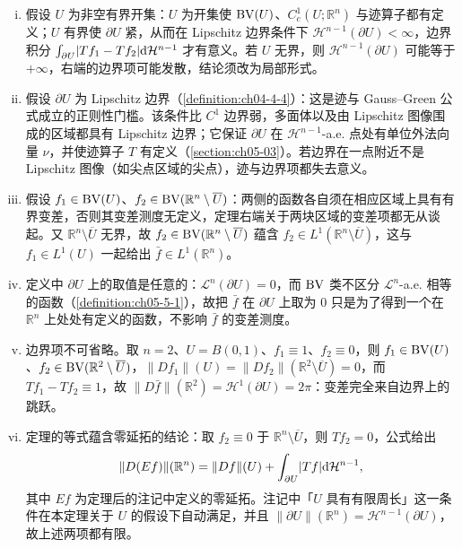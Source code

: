 \documentclass[../../main.tex]{subfiles}%
\begin{document}
\begin{remark}\label{remark:ch05-thm-5-8-条件}
\begin{enumerate}[(i)]
\item 假设 $U$ 为非空有界开集：$U$ 为开集使 $\mathrm{BV}(U)$、$C_c^1(U;\mathbb{R}^n)$ 与迹算子都有定义；$U$ 有界使 $\partial U$ 紧，从而在 Lipschitz 边界条件下 $\mathcal{H}^{n-1}(\partial U)<\infty$，边界积分 $\int_{\partial U}\lvert Tf_1-Tf_2\rvert\mathrm{d}\mathcal{H}^{n-1}$ 才有意义。若 $U$ 无界，则 $\mathcal{H}^{n-1}(\partial U)$ 可能等于 $+\infty$，右端的边界项可能发散，结论须改为局部形式。
\item 假设 $\partial U$ 为 Lipschitz 边界（\cref{definition:ch04-4-4}）：这是迹与 Gauss--Green 公式成立的正则性门槛。该条件比 $C^1$ 边界弱，多面体以及由 Lipschitz 图像围成的区域都具有 Lipschitz 边界；它保证 $\partial U$ 在 $\mathcal{H}^{n-1}$-a.e. 点处有单位外法向量 $\nu$，并使迹算子 $T$ 有定义（\cref{section:ch05-03}）。若边界在一点附近不是 Lipschitz 图像（如尖点区域的尖点），迹与边界项都失去意义。%
\item 假设 $f_1\in\mathrm{BV}(U)$、$f_2\in\mathrm{BV}(\mathbb{R}^n\setminus\overline{U})$：两侧的函数各自须在相应区域上具有有界变差，否则其变差测度无定义，定理右端关于两块区域的变差项都无从谈起。又 $\mathbb{R}^n\setminus\overline{U}$ 无界，故 $f_2\in\mathrm{BV}(\mathbb{R}^n\setminus\overline{U})$ 蕴含 $f_2\in L^1(\mathbb{R}^n\setminus\overline{U})$，这与 $f_1\in L^1(U)$ 一起给出 $\bar f\in L^1(\mathbb{R}^n)$。
\item 定义中 $\partial U$ 上的取值是任意的：$\mathcal{L}^n(\partial U)=0$，而 $\mathrm{BV}$ 类不区分 $\mathcal{L}^n$-a.e. 相等的函数（\cref{definition:ch05-5-1}），故把 $\bar f$ 在 $\partial U$ 上取为 $0$ 只是为了得到一个在 $\mathbb{R}^n$ 上处处有定义的函数，不影响 $\bar f$ 的变差测度。%
\item 边界项不可省略。取 $n=2$、$U=B(0,1)$、$f_1\equiv1$、$f_2\equiv0$，则 $f_1\in\mathrm{BV}(U)$、$f_2\in\mathrm{BV}(\mathbb{R}^2\setminus\overline{U})$，$\lVert Df_1\rVert(U)=\lVert Df_2\rVert(\mathbb{R}^2\setminus\overline{U})=0$，而 $Tf_1-Tf_2\equiv1$，故 $\lVert D\bar f\rVert(\mathbb{R}^2)=\mathcal{H}^1(\partial U)=2\pi$：变差完全来自边界上的跳跃。
\item 定理的等式蕴含零延拓的结论：取 $f_2\equiv0$ 于 $\mathbb{R}^n\setminus\overline{U}$，则 $Tf_2=0$，公式给出
\begin{align*}
\lVert D(Ef)\rVert(\mathbb{R}^n)=\lVert Df\rVert(U)+\int_{\partial U}\lvert Tf\rvert\mathrm{d}\mathcal{H}^{n-1},
\end{align*}
其中 $Ef$ 为定理后的注记中定义的零延拓。注记中「$U$ 具有有限周长」这一条件在本定理关于 $U$ 的假设下自动满足，并且 $\lVert\partial U\rVert(\mathbb{R}^n)=\mathcal{H}^{n-1}(\partial U)$，故上述两项都有限。
\end{enumerate}
\end{remark}
\end{document}
